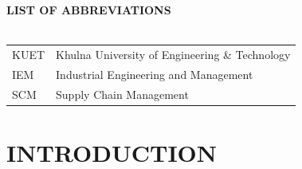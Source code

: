 \documentclass[a4paper,12pt,oneside]{book}
\newcommand{\blanklineR}{\hfill \\} %
\newcommand{\HeadingR}[1]{%
{\large			%
\bfseries{#1}}}
\begin{document}


\newpage
\renewcommand\contentsname{CONTENTS}
\begin{singlespacing}
{\hypersetup{linkcolor=black}
\tableofcontents
}
\end{singlespacing}
\newpage
{} \label{listoftab}
{\hypersetup{linkcolor=black}
\listoftables
}
\newpage
{} \label{listoffig}
{\hypersetup{linkcolor=black}
\listoffigures
}

\newpage
{} \label{abbrv}

\begin{center}
\HeadingR{\MakeUppercase{List of Abbreviations}}
\blanklineR \blanklineR
\begin{longtable}{l@{\qquad}l}
KUET & Khulna University of Engineering \& Technology \\
IEM & Industrial Engineering and Management\\
SCM & Supply Chain Management\\
\end{longtable}
\end{center}


\mainmatter
{} %
\chapter{INTRODUCTION}\label{chap:intro}
\end{document}
